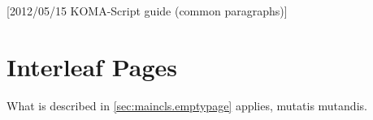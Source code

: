 %
%
%
%
%
%
%
%
% 
%
%
%
%

[2012/05/15 KOMA-Script guide (common paragraphs)]


\makeatletter
{}%
%
%
%
\makeatother


\section{Interleaf Pages}
\label{sec:\csname label@base\endcsname.emptypage}%
\ifshortversion\IgnoreThisfalse{}\fi%
\ifIgnoreThis %
 What is described in
\autoref{sec:maincls.emptypage} applies, mutatis mutandis.
\else %
%

